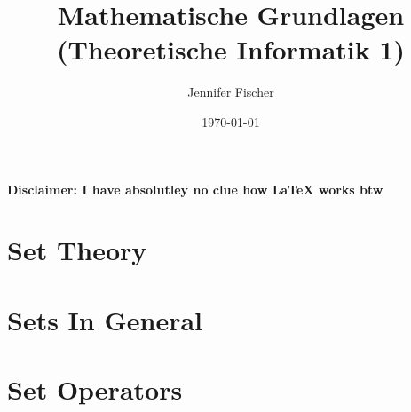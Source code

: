 \documentclass[a4paper,11pt]{article}
\title{Mathematische Grundlagen (Theoretische Informatik 1)}
\author{Jennifer Fischer}
\date{\today}
\begin{document}
\maketitle
\textbf{Disclaimer: I have absolutley no clue how LaTeX works btw}
\tableofcontents
\pagebreak
\begin{abstract}
\end{abstract}

\section{Set Theory}
\section*{Sets In General}
\section*{Set Operators}
\end{document}
